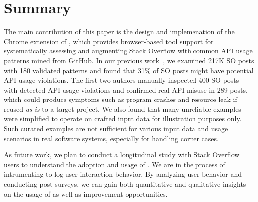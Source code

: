 \section{Summary}
\label{sec:summary}
The main contribution of this paper is the design and implemenation of the Chrome extension of {\tool}, which provides browser-based tool support for systematically assessing and augmenting Stack Overflow with common API usage patterns mined from GitHub. In our previous work~\cite{zhang2018code}, we examined 217K SO posts with 180 validated patterns and found that 31\% of SO posts might have potential API usage violations. The first two authors manually inspected 400 SO posts with detected API usage violations and confirmed real API misuse in 289 posts, which could produce symptoms such as program crashes and resource leak if reused {\em as-is} to a target project. We also found that many unreliable examples were simplified to operate on crafted input data for illustration purposes only. Such curated examples are not sufficient for various input data and usage scenarios in real software systems, especially for handling corner cases. %


As future work, we plan to conduct a longitudinal study with Stack Overflow users to understand the adoption and usage of {\tool}. We are in the process of intrumenting {\tool} to log user interaction behavior. By analyzing user behavior and conducting post surveys, we can gain both quantitative and qualitative insights on the usage of {\tool} as well as improvement opportunities. %
